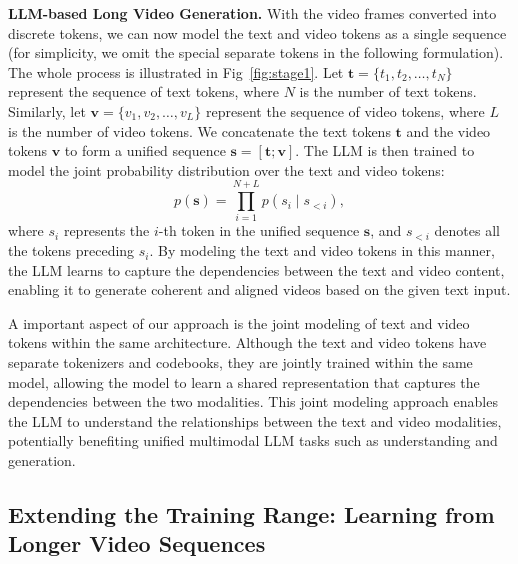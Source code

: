 \textbf{LLM-based Long Video Generation.} With the video frames converted into discrete tokens, we can now model the text and video tokens as a single sequence (for simplicity, we omit the special separate tokens in the following formulation). The whole process is illustrated in Fig~\ref{fig:stage1}. 
Let $\mathbf{t} = \{t_1, t_2, \ldots, t_N\}$ represent the sequence of text tokens, where $N$ is the number of text tokens. Similarly, let $\mathbf{v} = \{v_1, v_2, \ldots, v_L\}$ represent the sequence of video tokens, where $L$ is the number of video tokens. We concatenate the text tokens $\mathbf{t}$ and the video tokens $\mathbf{v}$ to form a unified sequence $\mathbf{s} = [\mathbf{t}; \mathbf{v}]$. The LLM is then trained to model the joint probability distribution over the text and video tokens:
\begin{equation}
p(\mathbf{s}) = \prod_{i=1}^{N+L} p(s_i \mid s_{<i}),
\end{equation}
where $s_i$ represents the $i$-th token in the unified sequence $\mathbf{s}$, and $s_{<i}$ denotes all the tokens preceding $s_i$. By modeling the text and video tokens in this manner, the LLM learns to capture the dependencies between the text and video content, enabling it to generate coherent and aligned videos based on the given text input.


A important aspect of our approach is the joint modeling of text and video tokens within the same architecture. Although the text and video tokens have separate tokenizers and codebooks, they are jointly trained within the same model, allowing the model to learn a shared representation that captures the dependencies between the two modalities. This joint modeling approach enables the LLM to understand the relationships between the text and video modalities, potentially benefiting unified multimodal LLM tasks such as understanding and generation.

\subsection{Extending the Training Range: Learning from Longer Video Sequences}
\label{sec:3.2}

